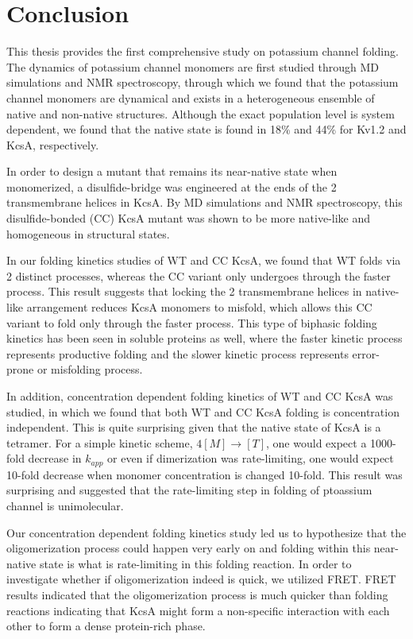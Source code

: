 \section{Conclusion}
This thesis provides the first comprehensive study on potassium channel folding. The dynamics of potassium channel monomers are first studied through MD simulations and NMR spectroscopy, through which we found that the potassium channel monomers are dynamical and exists in a heterogeneous ensemble of native and non-native structures. Although the exact population level is system dependent, we found that the native state is found in 18\% and 44\% for Kv1.2 and KcsA, respectively.

In order to design a mutant that remains its near-native state when monomerized, a disulfide-bridge was engineered at the ends of the 2 transmembrane helices in KcsA. By MD simulations and NMR spectroscopy, this disulfide-bonded (CC) KcsA mutant was shown to be more native-like and homogeneous in structural states.

In our folding kinetics studies of WT and CC KcsA, we found that WT folds via 2 distinct processes, whereas the CC variant only undergoes through the faster process. This result suggests that locking the 2 transmembrane helices in native-like arrangement reduces KcsA monomers to misfold, which allows this CC variant to fold only through the faster process. This type of biphasic folding kinetics has been seen in soluble proteins as well, where the faster kinetic process represents productive folding and the slower kinetic process represents error-prone or misfolding process.

In addition, concentration dependent folding kinetics of WT and CC KcsA was studied, in which we found that both WT and CC KcsA folding is concentration independent. This is quite surprising given that the native state of KcsA is a tetramer. For a simple kinetic scheme, $ 4 [M] \rightarrow [T]$, one would expect a 1000-fold decrease in $k_{app}$ or even if dimerization was rate-limiting, one would expect 10-fold decrease when monomer concentration is changed 10-fold. This result was surprising and suggested that the rate-limiting step in folding of ptoassium channel is unimolecular.

Our concentration dependent folding kinetics study led us to hypothesize that the oligomerization process could happen very early on and folding within this near-native state is what is rate-limiting in this folding reaction. In order to investigate whether if oligomerization indeed is quick, we utilized FRET. FRET results indicated that the oligomerization process is much quicker than folding reactions indicating that KcsA might form a non-specific interaction with each other to form a dense protein-rich phase.


